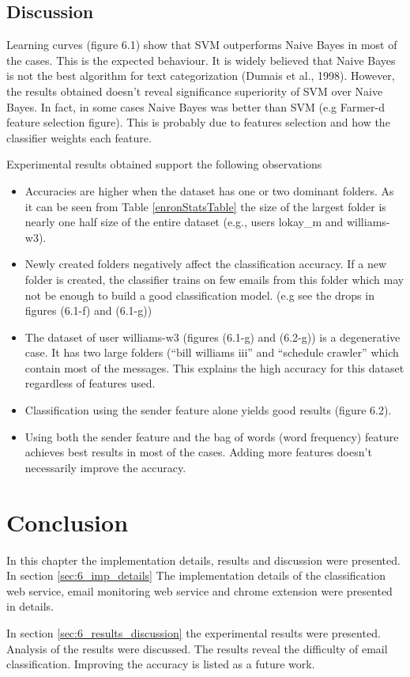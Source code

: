 \subsection{Discussion}
Learning curves (figure 6.1) show that SVM outperforms Naive Bayes in most of 
the cases. This is the expected behaviour. It is widely believed that Naive Bayes 
is not the best algorithm for text categorization (Dumais et al., 1998)\cite{DHS98}.
However, the results obtained doesn't reveal significance superiority of SVM over 
Naive Bayes. In fact, in some cases Naive Bayes was better than SVM (e.g Farmer-d 
feature selection figure). This is probably due to features selection and how 
the classifier weights each feature.


Experimental results obtained support the following observations
\begin{itemize}
  \item Accuracies are higher when the dataset has one or two dominant folders. 
  As it can be seen from Table \ref{enronStatsTable} the size of the largest folder 
  is nearly one half size of the entire dataset (e.g., users lokay\_m and williams-w3).

  \item Newly created folders negatively affect the classification accuracy. If a new 
  folder is created, the classifier trains on few emails from this folder which may 
  not be enough to build a good classification model. (e.g see the drops in figures 
  (6.1-f) and (6.1-g))

  \item The dataset of user williams-w3 (figures (6.1-g) and (6.2-g)) is a degenerative 
  case. It has two large folders (``bill williams iii'' and ``schedule crawler'' which 
  contain most of the messages. This explains the high accuracy for this dataset regardless 
  of features used.

  \item Classification using the sender feature alone yields good results (figure 6.2).

  \item Using both the sender feature and the bag of words (word frequency) feature 
  achieves best results in most of the cases. Adding more features doesn't necessarily 
  improve the accuracy.

\end{itemize}

\section{Conclusion}
\label{sec:conclusion_6}
In this chapter the implementation details, results and discussion were presented. In section 
\ref{sec:6_imp_details} The implementation details of the classification web service, 
email monitoring web service and chrome extension were presented in details.

In section \ref{sec:6_results_discussion} the experimental results were presented.
Analysis of the results were discussed. The results reveal the difficulty of email 
classification. Improving the accuracy is listed as a future work.

